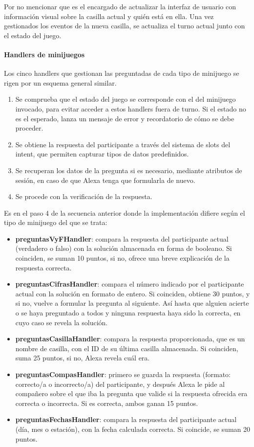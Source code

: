 Por no mencionar que es el encargado de actualizar la interfaz de usuario con información visual sobre la casilla actual y quién está en ella. 
Una vez gestionados los eventos de la nueva casilla, se actualiza el turno actual junto con el estado del juego.

\paragraph{Handlers de minijuegos}

Los cinco handlers que gestionan las preguntadas de cada tipo de minijuego se rigen por un esquema general similar.

\begin{enumerate}
	\item Se comprueba que el estado del juego se corresponde con el del minijuego invocado, para evitar acceder a estos handlers fuera de turno. Si el estado no es el esperado, lanza un mensaje de error y recordatorio de cómo se debe proceder.
	\item Se obtiene la respuesta del participante a través del sistema de slots del intent, que permiten capturar tipos de datos predefinidos.
	\item Se recuperan los datos de la pregunta si es necesario, mediante atributos de sesión, en caso de que Alexa tenga que formularla de nuevo.
	\item Se procede con la verificación de la respuesta.
\end{enumerate}

Es en el paso 4 de la secuencia anterior donde la implementación difiere según el tipo de minijuego del que se trata:

\begin{itemize}
	\item \textbf{preguntasVyFHandler}: compara la respuesta del participante actual (verdadero o falso) con la solución almacenada en forma de booleano. Si coinciden, se suman 10 puntos, si no, ofrece una breve explicación de la respuesta correcta.
	\item \textbf{preguntasCifrasHandler}: compara el número indicado por el participante actual con la solución en formato de entero. Si coinciden, obtiene 30 puntos, y si no, vuelve a formular la pregunta al siguiente. Así hasta que alguien acierte o se haya preguntado a todos y ninguna respuesta haya sido la correcta, en cuyo caso se revela la solución.
	\item \textbf{preguntasCasillaHandler}: compara la respuesta proporcionada, que es un nombre de casilla, con el ID de su última casilla almacenada. Si coinciden, suma 25 puntos, si no, Alexa revela cuál era.
	\item \textbf{preguntasCompasHandler}: primero se guarda la respuesta (formato: correcto/a o incorrecto/a) del participante, y después Alexa le pide al compañero sobre el que iba la pregunta que valide si la respuesta ofrecida era correcta o incorrecta. Si es correcta, ambos ganan 15 puntos.
	\item \textbf{preguntasFechasHandler}: compara la respuesta del participante actual (día, mes o estación), con la fecha calculada correcta. Si coincide, se suman 20 puntos.
\end{itemize}

